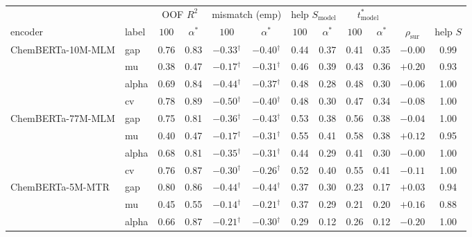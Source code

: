 \begin{tabular}{llcccccccccc}
\toprule
 & & \multicolumn{2}{c}{OOF $R^2$} & \multicolumn{2}{c}{mismatch (emp)} & \multicolumn{2}{c}{help $S_{\mathrm{model}}$} & \multicolumn{2}{c}{$t^*_{\mathrm{model}}$} & & \\
\cmidrule(lr){3-4}\cmidrule(lr){5-6}\cmidrule(lr){7-8}\cmidrule(lr){9-10}
encoder & label & $100$ & $\alpha^*$ & $100$ & $\alpha^*$ & $100$ & $\alpha^*$ & $100$ & $\alpha^*$ & $\rho_{\mathrm{sur}}$ & help $S$ \\
\midrule
ChemBERTa-10M-MLM & gap & 0.76 & 0.83 & $-0.33$$^\dagger$ & $-0.40$$^\dagger$ & 0.44 & 0.37 & 0.41 & 0.35 & $-0.00$ & 0.99 \\
 & mu & 0.38 & 0.47 & $-0.17$$^\dagger$ & $-0.31$$^\dagger$ & 0.46 & 0.39 & 0.43 & 0.36 & $+0.20$ & 0.93 \\
 & alpha & 0.69 & 0.84 & $-0.44$$^\dagger$ & $-0.37$$^\dagger$ & 0.48 & 0.28 & 0.48 & 0.30 & $-0.06$ & 1.00 \\
 & cv & 0.78 & 0.89 & $-0.50$$^\dagger$ & $-0.40$$^\dagger$ & 0.48 & 0.30 & 0.47 & 0.34 & $-0.08$ & 1.00 \\
\addlinespace[2pt]
ChemBERTa-77M-MLM & gap & 0.75 & 0.81 & $-0.36$$^\dagger$ & $-0.43$$^\dagger$ & 0.53 & 0.38 & 0.56 & 0.38 & $-0.04$ & 1.00 \\
 & mu & 0.40 & 0.47 & $-0.17$$^\dagger$ & $-0.31$$^\dagger$ & 0.55 & 0.41 & 0.58 & 0.38 & $+0.12$ & 0.95 \\
 & alpha & 0.68 & 0.81 & $-0.35$$^\dagger$ & $-0.31$$^\dagger$ & 0.44 & 0.29 & 0.41 & 0.30 & $-0.00$ & 1.00 \\
 & cv & 0.76 & 0.87 & $-0.30$$^\dagger$ & $-0.26$$^\dagger$ & 0.52 & 0.40 & 0.55 & 0.41 & $-0.11$ & 1.00 \\
\addlinespace[2pt]
ChemBERTa-5M-MTR & gap & 0.80 & 0.86 & $-0.44$$^\dagger$ & $-0.44$$^\dagger$ & 0.37 & 0.30 & 0.23 & 0.17 & $+0.03$ & 0.94 \\
 & mu & 0.45 & 0.55 & $-0.14$$^\dagger$ & $-0.21$$^\dagger$ & 0.37 & 0.29 & 0.21 & 0.20 & $+0.16$ & 0.88 \\
 & alpha & 0.66 & 0.87 & $-0.21$$^\dagger$ & $-0.30$$^\dagger$ & 0.29 & 0.12 & 0.26 & 0.12 & $-0.20$ & 1.00 \\

\end{tabular}
